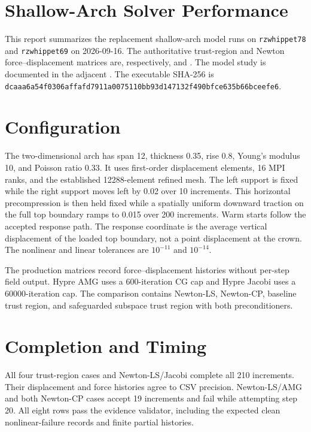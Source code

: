 \documentclass[11pt]{article}
\begin{document}
\sloppy

\section*{Shallow-Arch Solver Performance}

This report summarizes the replacement shallow-arch model runs on
\texttt{rzwhippet78} and \texttt{rzwhippet69} on 2026-09-16.  The authoritative
trust-region and Newton force--displacement matrices are, respectively,
and
.
The model study is documented in the adjacent
.  The executable SHA-256 is
\texttt{dcaaa6a54f0306affafd7911a0075110bb93d147132f490bfce635b66bceefe6}.

\section*{Configuration}

The two-dimensional arch has span 12, thickness 0.35, rise 0.8, Young's modulus
10, and Poisson ratio 0.33.  It uses first-order displacement elements, 16 MPI
ranks, and the established 12288-element refined mesh.  The left support is
fixed while the right support moves left by 0.02 over 10 increments.  This
horizontal precompression is then held fixed while a spatially uniform downward
traction on the full top boundary ramps to 0.015 over 200 increments.  Warm
starts follow the accepted response path.  The response coordinate is the
average vertical displacement of the loaded top boundary, not a point
displacement at the crown.  The nonlinear and linear tolerances are
$10^{-11}$ and $10^{-14}$.

The production matrices record force--displacement histories without per-step
field output.  Hypre AMG uses a 600-iteration CG cap and Hypre Jacobi uses a
60000-iteration cap.  The comparison contains Newton-LS, Newton-CP, baseline
trust region, and safeguarded subspace trust region with both preconditioners.

\section*{Completion and Timing}

All four trust-region cases and Newton-LS/Jacobi complete all 210 increments.
Their displacement and force histories agree to CSV precision. Newton-LS/AMG
and both Newton-CP cases accept 19 increments and fail while attempting step 20.
All eight rows pass the evidence validator, including the expected clean
nonlinear-failure records and finite partial histories.
\end{document}
